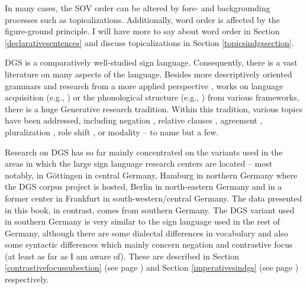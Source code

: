 \clearpage

\noindent In many cases, the SOV order can be altered by fore- and backgrounding processes such as topicalizations. Additionally, word order is affected by the figure-ground principle. I will have more to say about word order in Section \ref{declarativesentences} and discuss topicalizations in Section \ref{topicsindgssection}. 



DGS is a comparatively well-studied sign language. Consequently, there is a vast literature on many aspects of the language. Besides more descriptively oriented grammars \citep{papaspyrou2008grammatik,happ2014vork} and research from a more applied perspective \citep{eichmannhansenhessmann2012,dumig2013}, works on language acquisition (e.g., \citealt{leuninger1997lena,hanel2005spracherwerb,haenelfaul2012erwerb}) or the phonological structure (e.g., \citealt{benner2012,herrmann2012prosody,dumig2013}) from various frameworks, there is a huge Generative research tradition. Within this tradition, various topics have been addressed, including negation \citep{pfau2008headshake,pfau2016featural}, relative clauses \citep{pfau2005relative}, agreement \citep{pfau2006thedevelopment,steinbach2007grammaticalization,steinbach2011agreement,pfausalzmannsteinbach2018agreement}, pluralization \citep{pfausteinbach2004}, role shift \citep{hermannsteinbach2012quotation}, or modality \citep{herrmann2007,herrmann2013modal} -- to name but a few.

Research on DGS has so far mainly concentrated on the variants used in the areas in which the large sign language research centers are located -- most notably, in Göttingen in central Germany, Hamburg in northern Germany where the DGS corpus project \citep{jahn2018} is hosted, Berlin in north-eastern Germany and in a former center in Frankfurt in south-western/central Germany. The data presented in this book, in contrast, comes from southern Germany. The DGS variant used in southern Germany is very similar to the sign language used in the rest of Germany, although there are some dialectal differences in vocabulary and also some syntactic differences which mainly concern negation and contrastive focus (at least as far as I am aware of). These are described in Section \ref{contrastivefocussubection} (see page \pageref{contrastivefocus}) and Section \ref{imperativesindgs} (see page \pageref{negationnegaation}) respectively. 


\largerpage
